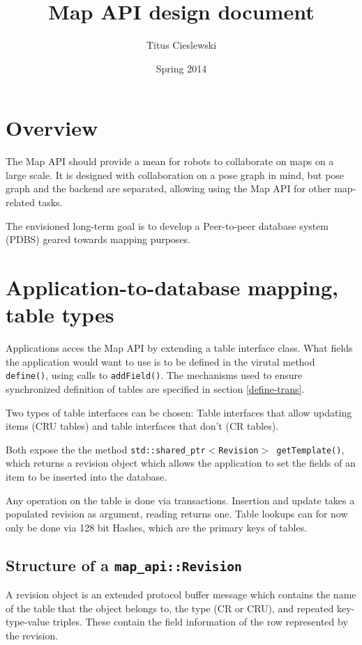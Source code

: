 \documentclass{article}
\title{Map API design document}
\author{Titus Cieslewski}
\date{Spring 2014}
\begin{document}
\maketitle

\section{Overview}

The Map API should provide a mean for robots to collaborate on maps on a large
scale. It is designed with collaboration on a pose graph in mind, but pose
graph and the backend are separated, allowing using the Map API for other
map-related tasks.

The envisioned long-term goal is to develop a Peer-to-peer database system
(PDBS) geared towards mapping purposes.

\section{Application-to-database mapping, table types}

Applications acces the Map API by extending a table interface class. What
fields the application would want to use is to be defined in the virutal
method {\tt define()}, using calls to {\tt addField()}. The mechanisms used to
ensure synchronized definition of tables are specified in section 
\ref{define-trans}.

Two types of table interfaces can be chosen: Table interfaces that allow
updating items (CRU tables) and table interfaces that don't (CR tables). 

Both expose the the method {\tt std::shared\_ptr$<$Revision$>$ getTemplate()},
which returns a revision object which allows the application to set the fields
of an item to be inserted into the database.

Any operation on the table is done via transactions. Insertion and update takes
a populated revision as argument, reading returns one. Table lookups can for
now only be done via 128 bit Hashes, which are the primary keys of tables.

\subsection{Structure of a {\tt map\_api::Revision}}

A revision object is an extended protocol buffer message which contains the
name of the table that the object belongs to, the type (CR or CRU),
and repeated key-type-value
triples. These contain the field information of the row represented by the
revision.
\end{document}
